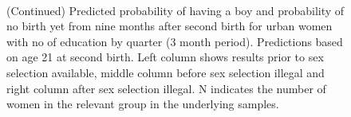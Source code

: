 \documentclass[12pt,letterpaper]{article}
\begin{document}
\begin{figure}[htpb]
{\begin{minipage}{0.31\textwidth}
        \captionsetup[subfigure]{labelformat=empty,position=top,captionskip=-1pt,farskip=-0.5pt}
        \\
        \captionsetup[subfigure]{labelformat=parens}
    \end{minipage}
}
\setcounter{subfigure}{6}
\caption{(Continued) Predicted probability of having a boy and probability of
no birth yet from nine months after second birth for urban 
women with no of education by quarter (3 month period). 
Predictions based on age 21 at second birth.
Left column shows results prior to sex selection available, middle column before
sex selection illegal and right column after sex selection illegal.
N indicates the number of women in the relevant group in the underlying samples.
}
\end{figure}
\end{document}
